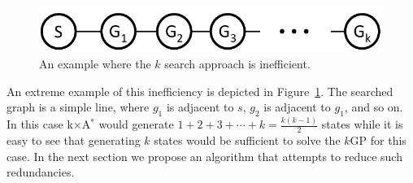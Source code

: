 \documentclass{aicom2e}
\newcommand{\kgs}{$k$GP}
\newcommand{\kxastar}{k$\times$A$^*$}
\begin{document}
\begin{figure}
    \includegraphics[width=\columnwidth]{k-search-bad_cropped}
    \caption{An example where the $k$ search approach is inefficient.}
    \label{fig:k-search-bad}
\end{figure}

An extreme example of this inefficiency is depicted in
Figure~\ref{fig:k-search-bad}. The searched graph is a simple line, where $g_1$
is adjacent to $s$, $g_2$ is adjacent to $g_1$, and so on. In this case
\kxastar{} would generate $1+2+3+\cdots+k=\frac{k(k-1)}{2}$ states while it is easy to
see that generating $k$ states would be sufficient to solve the \kgs{} for this
case.
In the next section we propose an algorithm that attempts to reduce such redundancies. %


\end{document}
